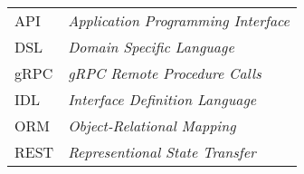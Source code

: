 \begin{longtable}{ll}
  API & \textit{Application Programming Interface} \\
  DSL & \textit{Domain Specific Language} \\
  gRPC & \textit{gRPC Remote Procedure Calls} \\
  IDL & \textit{Interface Definition Language} \\
  ORM & \textit{Object-Relational Mapping} \\
  REST & \textit{Representional State Transfer} \\
\end{longtable}


